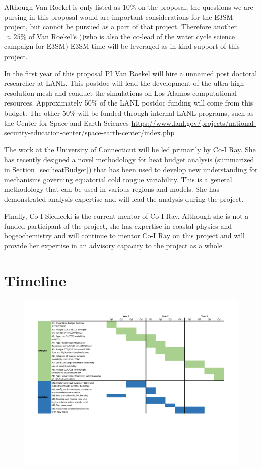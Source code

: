 Although Van Roekel is only listed as 10\% on the proposal, the questions we are pursing in this proposal would are important considerations for the E3SM project, but cannot be pursued as a part of that project.  Therefore another $\approx 25\%$ of Van Roekel's ()who is also the co-lead of the water cycle science campaign for E3SM) E3SM time will be leveraged as in-kind support of this project.

In the first year of this proposal PI Van Roekel will hire a unnamed post doctoral researcher at LANL.  This postdoc will lead the development of the ultra high resolution mesh and conduct the simulations on Los Alamos computational resources.  Approximately 50\% of the LANL postdoc funding will come from this budget.  The other 50\% will be funded through internal LANL programs, such as the Center for Space and Earth Sciences \url{https://www.lanl.gov/projects/national-security-education-center/space-earth-center/index.php}

The work at the University of Connecticut will be led primarily by Co-I Ray.  She has recently designed a novel methodology for heat budget analysis (summarized in Section~\ref{sec:heatBudget}) that has been used to develop new understanding for mechanisms governing equatorial cold tongue variability.  This is a general methodology that can be used in various regions and models.  She has demonstrated analysis expertise and will lead the analysis during the project.

Finally, Co-I Siedlecki is the current mentor of Co-I Ray.  Although she is not a funded participant of the project, she has expertise in coastal physics and bogeochemistry and will continue to mentor Co-I Ray on this project and will provide her expertise in an advisory capacity to the project as a whole.

\section{Timeline}

\begin{figure}[h]
	\centering
	\includegraphics[width=1\textwidth]{Timeline_NASA.pdf}
\end{figure}



